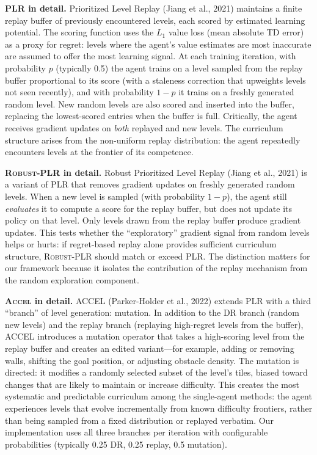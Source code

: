 \documentclass[11pt,a4paper]{article}
\theoremstyle{remark}
\newcommand{\accel}{\textsc{Accel}}
\newcommand{\plr}{\textsc{PLR}}
\newcommand{\rplr}{\textsc{Robust-PLR}}
\begin{document}
\textbf{\plr{} in detail.} Prioritized Level Replay (Jiang et al., 2021) maintains a finite replay buffer of previously encountered levels, each scored by estimated learning potential. The scoring function uses the $L_1$ value loss (mean absolute TD error) as a proxy for regret: levels where the agent's value estimates are most inaccurate are assumed to offer the most learning signal. At each training iteration, with probability $p$ (typically 0.5) the agent trains on a level sampled from the replay buffer proportional to its score (with a staleness correction that upweights levels not seen recently), and with probability $1-p$ it trains on a freshly generated random level. New random levels are also scored and inserted into the buffer, replacing the lowest-scored entries when the buffer is full. Critically, the agent receives gradient updates on \textit{both} replayed and new levels. The curriculum structure arises from the non-uniform replay distribution: the agent repeatedly encounters levels at the frontier of its competence.

\textbf{\rplr{} in detail.} Robust Prioritized Level Replay (Jiang et al., 2021) is a variant of \plr{} that removes gradient updates on freshly generated random levels. When a new level is sampled (with probability $1-p$), the agent still \textit{evaluates} it to compute a score for the replay buffer, but does not update its policy on that level. Only levels drawn from the replay buffer produce gradient updates. This tests whether the ``exploratory'' gradient signal from random levels helps or hurts: if regret-based replay alone provides sufficient curriculum structure, \rplr{} should match or exceed \plr{}. The distinction matters for our framework because it isolates the contribution of the replay mechanism from the random exploration component.

\textbf{\accel{} in detail.} ACCEL (Parker-Holder et al., 2022) extends \plr{} with a third ``branch'' of level generation: mutation. In addition to the DR branch (random new levels) and the replay branch (replaying high-regret levels from the buffer), ACCEL introduces a mutation operator that takes a high-scoring level from the replay buffer and creates an edited variant---for example, adding or removing walls, shifting the goal position, or adjusting obstacle density. The mutation is directed: it modifies a randomly selected subset of the level's tiles, biased toward changes that are likely to maintain or increase difficulty. This creates the most systematic and predictable curriculum among the single-agent methods: the agent experiences levels that evolve incrementally from known difficulty frontiers, rather than being sampled from a fixed distribution or replayed verbatim. Our implementation uses all three branches per iteration with configurable probabilities (typically 0.25 DR, 0.25 replay, 0.5 mutation).
\end{document}
